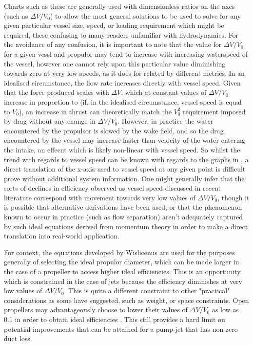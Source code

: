 \documentclass{article}\usepackage[]{graphicx}\usepackage[]{color}
\begin{document}
Charts such as these are generally used with dimensionless ratios on the axes (such as $\Delta V / V_0$) to allow the most general solutions to be used to solve for any given particular vessel size, speed, or loading requirement which might be required, these  confusing to many readers unfamiliar with hydrodynamics.  For the avoidance of any confusion, it is important to note that the value for $\Delta V / V_0$ for a given vessl and propulor may tend to increase with increasing waterspeed of the vessel, however one cannot rely upon this particular value diminishing towards zero at very low speeds, as it does for related by different metrics.  In an idealised circumstance, the flow rate increases directly with vessel speed.  Given that the force produced scales with $\Delta V$, which at constant values of $\Delta V / V_0$ increase in proportion to (if, in the idealised circumstance, vessel speed is equal to $V_0$), an increase in thrust can theoretically match the $V_0^2$ requirement imposed by drag without any change in $\Delta V / V_0$.  However, in practice the water encountered by the propulsor is slowed by the wake field, and so the drag encountered by the vessel may increase faster than velocity of the water entering the intake, an effecnt which is likely non-linear with vessel speed.  So whilst the trend with regards to vessel speed can be known with regards to the graphs in \cite{figLPumpjetEfficiency}, a direct translation of the x-axis used to vessel speed at any given point is difficult prove without additional system information.  One might generally infer that the sorts of declines in efficiency observed as vessel speed discussed in recent literature correspond with movement towards very low values of $\Delta V / V_0$, though it is possible that alternative derivations have been used, or that the phenomenon known to occur in practice (such as flow separation) aren't adequately captured by such ideal equations derived from momentum theory in order to make a direct translation into real-world application.

For context, the equations developed by Wislicenus are used for the purposes generally of selecting the ideal propulor diameter, which can be made larger in the case of a propeller to access higher ideal efficiencies.  This is an opportunity which is constrained in the case of jets because the efficiency diminishes at very low values of $\Delta V / V_0$.  This is quite a different constraint to other "practical" considerations as some have suggested, such as weight, or space constraints.  Open propellers may advantageously choose to lower their values of $\Delta V / V_0$ as low as 0.1 in order to obtain ideal efficiencies \parencite{wislicenus1973}.  This still provides a hard limit on potential improvements that can be attained for a pump-jet that has non-zero duct loss.
\end{document}
